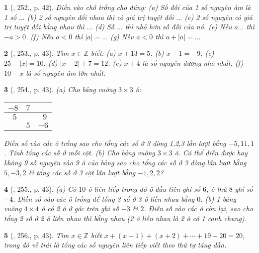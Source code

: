 \documentclass{article}
\newtheorem{baitoan}{}
\begin{document}
\begin{baitoan}[\cite{Binh_Toan_6_tap_1}, 252., p. 42]
	Điền vào chỗ trống cho đúng: (a) Số đối của 1 số nguyên âm là 1 số $\ldots$ (b) 2 số nguyên đối nhau thì có giá trị tuyệt đối $\ldots$ (c) 2 số nguyên có giá trị tuyệt đối bằng nhau thì $\ldots$ (d) Số $\ldots$ thì nhỏ hơn số đối của nó. (e) Nếu $a\ldots$ thì $-a > 0$. (f) Nếu $a < 0$ thì $|a| = \ldots$ (g) Nếu $a < 0$ thì $a + |a| = \ldots$
\end{baitoan}

\begin{baitoan}[\cite{Binh_Toan_6_tap_1}, 253., p. 43]
	Tìm $x\in\mathbb{Z}$ biết: (a) $x + 13 = 5$. (b) $x - 1 = -9$. (c) $25 - |x| = 10$. (d) $|x - 2| + 7 = 12$. (e) $x + 4$ là số nguyên dương nhỏ nhất. (f) $10 - x$ là số nguyên âm lớn nhất.
\end{baitoan}

\begin{baitoan}[\cite{Binh_Toan_6_tap_1}, 254., p. 43]
	(a) Cho bảng vuông $3\times 3$ ô:
	\begin{table}[H]
		\centering
		\begin{tabular}{|c|c|c|}
			\hline
			$-8$ & $7$ &  \\
			\hline
			$\ \ 5$ &  & $\ \ 9$ \\
			\hline
			& $5$ & $-6$ \\
			\hline
		\end{tabular}
	\end{table}
	\noindent Điền số vào các ô trống sao cho tổng các số ở 3 dòng 1,2,3 lần lượt bằng $-5,11,1$. Tính tổng các số ở mỗi cột. (b) Cho bảng vuông $3\times 3$ ô. Có thể điền được hay không 9 số nguyên vào 9 ô của bảng sao cho tổng các số ở 3 dòng lần lượt bằng $5,-3,2$ \& tổng các số ở 3 cột lần lượt bằng $-1,2,2$?
\end{baitoan}

\begin{baitoan}[\cite{Binh_Toan_6_tap_1}, 255., p. 43]
	(a) Có $10$ ô liên tiếp trong đó ô đầu tiên ghi số $6$, ô thứ $8$ ghi số $-4$. Điền số vào các ô trống để tổng 3 số ở 3 ô liền nhau bằng $0$. (b) 1 bảng vuông $4\times 4$ ô có 2 ô ở góc trên ghi số $-3$ \& $2$. Điền số vào các ô còn lại, sao cho tổng 2 số ở 2 ô liền nhau thì bằng nhau (2 ô liền nhau là 2 ô có 1 cạnh chung).	
\end{baitoan}

\begin{baitoan}[\cite{Binh_Toan_6_tap_1}, 256., p. 43]
	Tìm $x\in\mathbb{Z}$ biết $x + (x + 1) + (x + 2) + \cdots + 19 + 20 = 20$, trong đó vế trái là tổng các số nguyên liên tiếp viết theo thứ tự tăng dần.
\end{baitoan}
\end{document}
